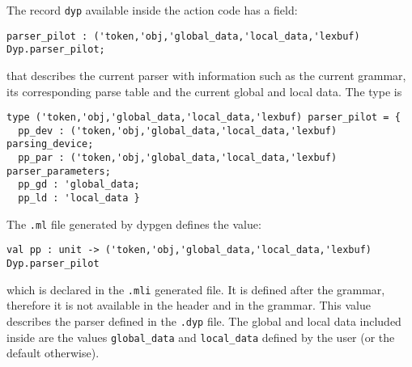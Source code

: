 \documentclass[12pt]{article}
\begin{document}
{The record \verb|dyp| available inside the action code has a field:
\begin{verbatim}
parser_pilot : ('token,'obj,'global_data,'local_data,'lexbuf) Dyp.parser_pilot;
\end{verbatim}
that describes the current parser with information such as the current grammar, its corresponding parse table and the current global and local data. The type is
\begin{verbatim}
type ('token,'obj,'global_data,'local_data,'lexbuf) parser_pilot = {
  pp_dev : ('token,'obj,'global_data,'local_data,'lexbuf) parsing_device;
  pp_par : ('token,'obj,'global_data,'local_data,'lexbuf) parser_parameters;
  pp_gd : 'global_data;
  pp_ld : 'local_data }
\end{verbatim}
The \verb|.ml| file generated by dypgen defines the value:
\begin{verbatim}
val pp : unit -> ('token,'obj,'global_data,'local_data,'lexbuf) Dyp.parser_pilot
\end{verbatim}
which is declared in the \verb|.mli| generated file. It is defined after the grammar, therefore it is not available in the header and in the grammar. This value describes the parser defined in the \verb|.dyp| file. The global and local data included inside are the values \verb|global_data| and \verb|local_data| defined by the user (or the default otherwise).\\

}
\end{document}
